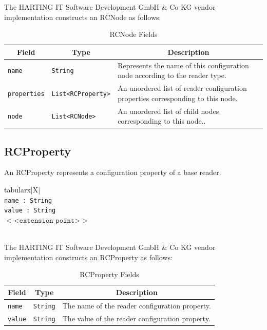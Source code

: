 \documentclass[11pt,a4paper,oneside]{article}
\newenvironment{bbox}%
{\begin{table}[h!]\begin{threeparttable}}%
{\end{threeparttable}\end{table}\FloatBarrier}
\newenvironment{bbox}
{\ifvmode\IgnorePar\fi \EndP\Tg<div class='bbox'>}{\Tg</div>\IgnoreIndent}
\begin{document}
The HARTING IT Software Development GmbH \& Co KG vendor implementation constructs an RCNode as follows:

\begin{table}[!h]
\begin{tabularx}{\textwidth}{|l|l|X|}
\hline
\multicolumn{1}{|c|}{\textbf{Field}}&
\multicolumn{1}{c|}{\textbf{Type}}&
\multicolumn{1}{c|}{\textbf{Description}}\\
\hline
\texttt{name}&\texttt{String}& Represents the name of this configuration node according to the reader type.\\
\hline
\texttt{properties}&\texttt{List<RCProperty>}&An unordered list of reader configuration properties corresponding to this node.\\
\hline
\texttt{node}&\texttt{List<RCNode>}&An unordered list of child nodes corresponding to this node..\\
\hline
\end {tabularx}
\caption{RCNode Fields}
\MakeLineNo
\end{table}
\FloatBarrier

\subsection{RCProperty}
An RCProperty represents a configuration property of a base reader.

\begin{bbox}
\begin{edtable}{tabularx}{\linewidth}{|X|}
\hline 
{}
\\
\texttt{name : String }\\
\texttt{value : String}\\
$<$<$\texttt{extension point}$>$>$\\
\texttt{\textendash \textendash \textendash}\\
\hline
\end{edtable}
\end{bbox}

The HARTING IT Software Development GmbH \& Co KG vendor implementation constructs an RCProperty as follows:

\begin{table}[!h]
\begin{tabularx}{\linewidth}{|l|l|X|}
\hline
\multicolumn{1}{|c|}{
\textbf{Field}}&\multicolumn{1}{c|}{\textbf{Type}}&\multicolumn{1}{c|}{\textbf{Description}}\\
\hline
\texttt{name}&\texttt{String}&The name of the reader configuration property.\\
\hline
\texttt{value}&\texttt{String}&The value of the reader configuration property.\\
\hline
\end{tabularx}
\caption{RCProperty Fields}
\MakeLineNo
\end{table}
\FloatBarrier
\fi
\end{document}
